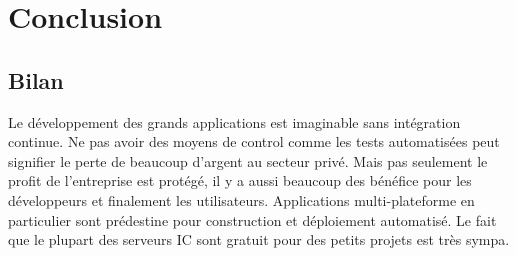 \chapter{Conclusion}
\label{chap:conclusion}

\section{Bilan}
Le développement des grands applications est imaginable sans intégration continue. Ne pas avoir des moyens de control comme les tests automatisées peut signifier le perte de beaucoup d'argent au secteur privé. Mais pas seulement le profit de l'entreprise est protégé, il y a aussi beaucoup des bénéfice pour les développeurs et finalement les utilisateurs.
Applications multi-plateforme en particulier sont prédestine pour construction et déploiement automatisé. 
Le fait que le plupart des serveurs IC sont gratuit pour des petits projets est très sympa.